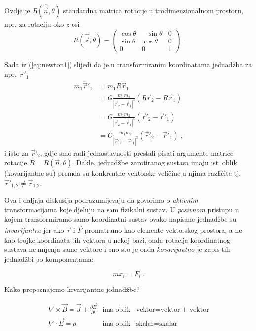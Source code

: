 Ovdje je $R(\hat{\vec{n}},\theta)$ standardna matrica rotacije u trodimenzionalnom
prostoru, npr. za rotaciju oko $z$-osi
\begin{equation}
R(\hat{\vec{z}},\theta) = \begin{pmatrix}
\cos\theta &  -\sin\theta &  0 \\
\sin\theta &  \cos\theta &  0 \\
    0  &       0     &  1 
\end{pmatrix} \;.
\label{eq:matrot}
\end{equation}

Sada iz (\ref{eq:newton1}) slijedi da je u transformiranim koordinatama
jednadžba za npr. $\vec{r}'_1$ 
\begin{equation*}
\begin{split}
m_1 \ddot{\vec{r}}'_1 &= m_1 R \ddot{\vec{r}}_1 \\
   &= G \frac{m_1 m_2}{|\vec{r}_2 - \vec{r}_1|^3}
    (R\vec{r}_2 - R\vec{r}_1) \\
   &= G \frac{m_1 m_2}{|\vec{r}_2 - \vec{r}_1|^3}
    (\vec{r}'_2 - \vec{r}'_1) \\
   &= G \frac{m_1 m_2}{|\vec{r}'_2 - \vec{r}'_1|^3}
    (\vec{r}'_2 - \vec{r}'_1) \;,
\end{split}
\end{equation*}
i isto za $\vec{r}'_2$, gdje smo radi jednostavnosti prestali
pisati argumente matrice rotacije $R = R(\vec{n},\theta)$.
Dakle, jednadžbe zarotiranog sustava imaju isti oblik
(kovarijantne su) premda su konkrentne vektorske veličine
u njima različite tj. $\vec{r}'_{1,2} \neq \vec{r}_{1,2}$.

Ova i daljnja diskusija podrazumijevaju da govorimo o \emph{aktivnim}
transformacijama koje djeluju na sam fizikalni sustav. U \emph{pasivnom}
pristupu u kojem transformiramo samo koordinatni sustav
ovako napisane jednadžbe su \emph{invarijantne} jer
ako $\vec{r}$ i $\vec{F}$ promatramo kao elemente vektorskog prostora,
a ne kao trojke koordinata tih vektora u nekoj bazi, onda rotacija
koordinatnog sustava ne mijenja same vektore i ono sto je onda
\emph{kovarijantno} je zapis tih jednadžbi po komponentama:
        
\begin{displaymath}
       m  \ddot{x}_{i} =  F_{i} \;.
\end{displaymath}


Kako prepoznajemo kovarijantne jednadžbe?

\begin{eqnarray*}
 \nabla\times\vec{B}=\vec{J}+\frac{\partial \vec{E}}{\partial t}
    &\textrm{ima oblik}&  \textrm{vektor=vektor + vektor} \\
 \nabla\cdot\vec{E}=\rho
    &\textrm{ima oblik}&  \textrm{skalar=skalar} \\
\end{eqnarray*}


